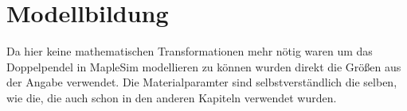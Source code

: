 \documentclass[a4paper, 10pt]{report}
\begin{document}
\section{Modellbildung}
Da hier keine mathematischen Transformationen mehr nötig waren um das Doppelpendel in MapleSim modellieren zu können wurden direkt die Größen aus der Angabe verwendet. Die Materialparamter sind selbstverständlich die selben, wie die, die auch schon in den anderen Kapiteln verwendet wurden.
\end{document}
